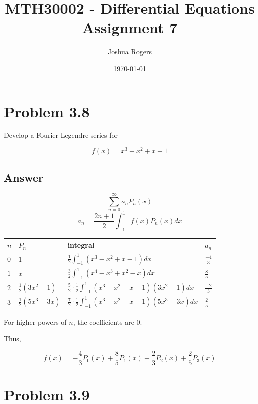\documentclass{article}
\title{\vspace{-4cm}MTH30002 - Differential Equations Assignment 7}
\author{Joshua Rogers}
\date\today
\begin{document}
\maketitle

\section*{Problem 3.8}

Develop a Fourier-Legendre series for

\begin{equation}\label{38A}
f(x) = x^3-x^2+x-1
\end{equation}


\subsection*{Answer}
$$ \sum_{n=0}^{\infty} a_n P_n (x) $$
$$ a_n = \frac{2n+1}{2} \int_{-1}^{1} f(x) P_n(x) dx $$

\begin{tabular}{
  |p{}
  |p{}
  |p{}
  |p{}|
  }
  \hline
  \centering $n$     & \centering $P_n$     & \centering integral & \centering\arraybackslash $a_n$     \\ \hline
  $0$ & $1$ & $\frac{1}{2} \int_{-1}^{1} \left(x^3-x^2+x-1\right) dx$ & $\frac{-4}{3}$ \\ \hline
  $1$ & $x$ & $\frac{3}{2} \int_{-1}^{1} \left(x^4-x^3+x^2-x\right) dx$ & $\frac{8}{5}$ \\ \hline
  $2$ & $\frac{1}{2} \left(3x^2-1\right)$ & $\frac{5}{2} \cdot \frac{1}{2} \int_{-1}^{1} \left(x^3-x^2+x-1\right)\left(3x^2-1\right) dx$ & $\frac{-2}{3}$ \\ \hline
  $3$ & $\frac{1}{2} \left(5x^3-3x\right)$ & $\frac{7}{2} \cdot \frac{1}{2} \int_{-1}^{1} \left(x^3-x^2+x-1\right)\left(5x^3-3x\right) dx$ & $\frac{2}{5}$ \\ \hline
\end{tabular}


For higher powers of $n$, the coefficients are 0.

Thus,

$$
f(x) = -\frac{4}{3} P_0(x) + \frac{8}{5} P_1(x) - \frac{2}{3} P_2(x) + \frac{2}{5} P_3(x)
$$

\section*{Problem 3.9}
\end{document}
